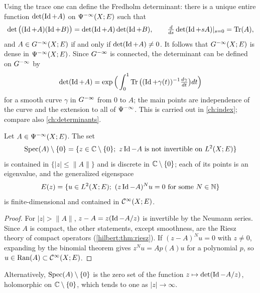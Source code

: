 \begin{remark}\label{manifolds:rem:determinant}
Using the trace one can define the Fredholm determinant: there is a unique entire
function $\det(\operatorname{Id}+A)$ on $\Psi^{-\infty}(X;E)$ such that
\begin{equation*}
\det\big((\operatorname{Id}+A)(\operatorname{Id}+B)\big)=\det(\operatorname{Id}+A)\det(\operatorname{Id}+B),\qquad
\tfrac{d}{ds}\det(\operatorname{Id}+sA)|_{s=0}=\operatorname{Tr}(A),
\end{equation*}
and $A\in G^{-\infty}(X;E)$ if and only if
$\det(\operatorname{Id}+A)\ne0$. It follows that $G^{-\infty}(X;E)$ is dense in $\Psi^{-\infty}(X;E)$. Since
$G^{-\infty}$ is connected, the determinant can be defined on $G^{-\infty}$ by
\begin{equation*}
\det(\operatorname{Id}+A)=\exp\Big(\int_0^1\operatorname{Tr}\big((\operatorname{Id}+\gamma(t))^{-1}\tfrac{d\gamma}{dt}\big)dt\Big)
\end{equation*}
for a smooth curve $\gamma$ in $G^{-\infty}$ from $0$ to $A$; the main points are independence of
the curve and the extension to all of $\Psi^{-\infty}$. This is carried out in
\cref{ch:index}; compare also \cref{ch:determinants}.
\end{remark}

\begin{proposition}\label{manifolds:prop:spectrum-smoothing}
Let $A\in\Psi^{-\infty}(X;E)$. The set
\begin{equation*}
\Spec(A)\setminus\{0\}=\{z\in\C\setminus\{0\};\ z\Id-A \text{ is not invertible on } L^2(X;E)\}
\end{equation*}
is contained in
$\{|z|\le\|A\|\}$ and is discrete in $\mathbb{C}\setminus\{0\}$; each of its points is an eigenvalue,
and the generalized eigenspace
\begin{equation*}
E(z)=\{u\in L^2(X;E);\ (z\operatorname{Id}-A)^Nu=0 \text{ for some } N\in\mathbb{N}\}
\end{equation*}
is finite-dimensional and contained in $\mathcal{C}^\infty(X;E)$.
\end{proposition}
\begin{proof}
For $|z|>\|A\|$, $z-A=z(\operatorname{Id}-A/z)$ is invertible by the Neumann series. Since $A$ is
compact, the other statements, except smoothness, are the Riesz theory of compact
operators (\cref{hilbert:thm:riesz}). If $(z-A)^Nu=0$ with $z\ne0$, expanding by the binomial
theorem gives $z^Nu=Ap(A)u$ for a polynomial $p$, so $u\in\operatorname{Ran}(A)\subset\mathcal{C}^\infty(X;E)$.
\end{proof}

Alternatively, $\operatorname{Spec}(A)\setminus\{0\}$ is the zero set of the function
$z\mapsto\det(\operatorname{Id}-A/z)$, holomorphic on $\mathbb{C}\setminus\{0\}$, which tends to one as $|z|\to\infty$.

